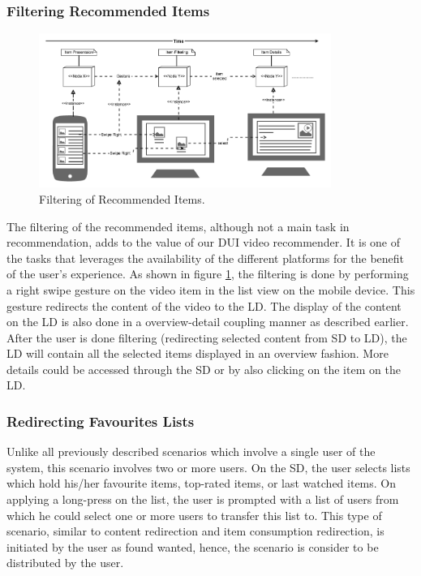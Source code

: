 \subsubsection{Filtering Recommended Items}
\begin{figure}[!htpb]
\includegraphics[width=0.85\textwidth, center, center]{figures/filtering}
\caption{Filtering of Recommended Items.}
\label{fig:figure39}
\end{figure}
The filtering of the recommended items, although not a main task in
recommendation, adds to the value of our DUI video recommender. It is one of the
tasks that leverages the availability of the different platforms for the benefit
of the user's experience. As shown in figure \ref{fig:figure39}, the filtering
is done by performing a right swipe gesture on the video item in the list view
on the mobile device. This gesture redirects the content of the video to the LD.
The display of the content on the LD is also done in a overview-detail coupling manner as described
earlier. After the user is done filtering (redirecting selected content from SD
to LD), the LD will contain all the selected items displayed in an overview
fashion. More details could be accessed through the SD or by also clicking on
the item on the LD.

\subsubsection{Redirecting Favourites Lists}
Unlike all previously described scenarios which involve a single user of the
system, this scenario involves two or more users. On the SD, the user selects
lists which hold his/her favourite items, top-rated items, or last watched
items. On applying a long-press on the list, the user is prompted with a list of
users from which he could select one or more users to transfer this list to.
This type of scenario, similar to content redirection and item consumption
redirection, is initiated by the user as found wanted, hence, the scenario is
consider to be distributed by the user.\par

